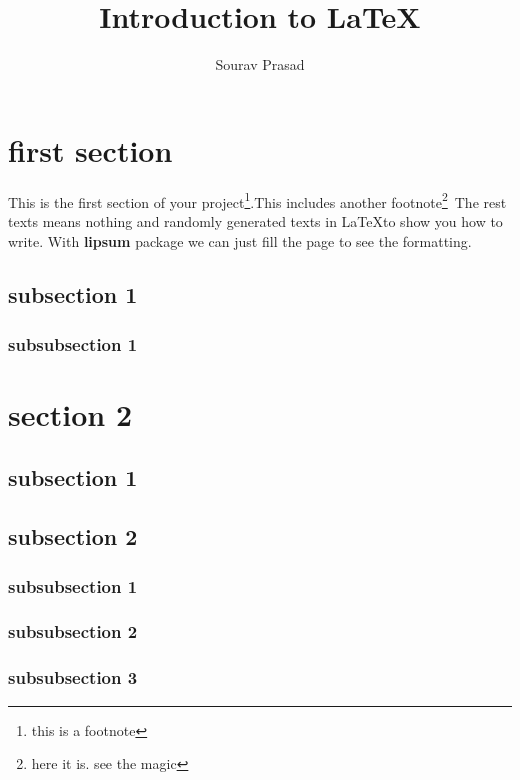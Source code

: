 \documentclass[a4paper,12pt]{article}
\title{Introduction to \LaTeX}
\author{Sourav Prasad}
\begin{document}
\maketitle

\section{first section }

This is the first section of your project\footnote{this is a footnote}.This includes another footnote\footnote{here it is. see the magic}\
The rest texts means nothing and randomly generated texts in \LaTeX to show you how to write. With \textbf{lipsum} package we can just fill the page to see the formatting.\


\lipsum[]
\subsection{subsection 1}
\lipsum[]
\subsubsection{subsubsection 1}
\lipsum[]

\section{section 2}
\lipsum[]
\subsection{subsection 1}
\lipsum[]
\subsection{subsection 2}
\lipsum[]
\subsubsection{subsubsection 1}
\lipsum[]
\subsubsection{subsubsection 2}
\lipsum[]
\subsubsection{subsubsection 3}
\lipsum[]
\end{document}
